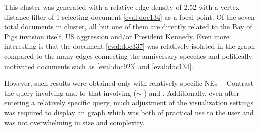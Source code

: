 This cluster was generated with a relative edge density of 2.52 with a vertex distance filter of 1 selecting document \ref{eval:doc134} as a focal point. Of the seven total documents in cluster, all but one of them are directly related to the Bay of Pigs invasion itself, US aggression and/or President Kennedy. Even more interesting is that the document \ref{eval:doc337} was relatively isolated in the graph compared to the many edges connecting the anniversary speeches and politically-motivated documents such as \ref{eval:doc923} and \ref{eval:doc134}.

However, such results were obtained only with relatively specific NEs--- Contrast the query involving  and  to that involving  ($\sim$ )  and . Additionally, even after entering a relatively specific query, much adjustment of the visualization settings was required to display an graph which was both of practical use to the user and was not overwhelming in size and complexity.